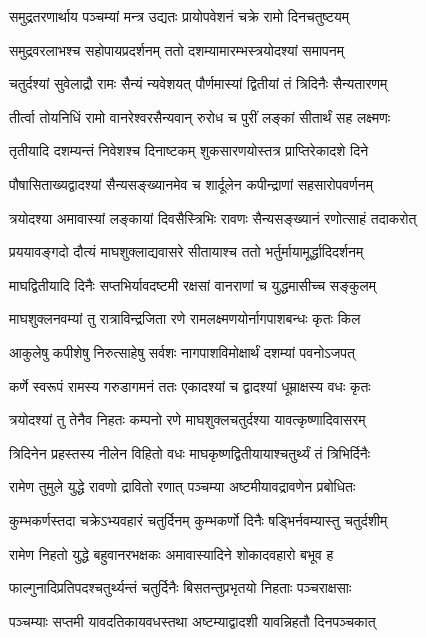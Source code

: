 \twolineshloka
{समुद्रतरणार्थाय पञ्चम्यां मन्त्र उद्यतः}
{प्रायोपवेशनं चक्रे रामो दिनचतुष्टयम्}%

\twolineshloka
{समुद्रवरलाभश्च सहोपायप्रदर्शनम्}
{ततो दशम्यामारम्भस्त्रयोदश्यां समापनम्}%

\twolineshloka
{चतुर्दश्यां सुवेलाद्रौ रामः सैन्यं न्यवेशयत्}
{पौर्णमास्यां द्वितीयां तं त्रिदिनैः सैन्यतारणम्}%

\twolineshloka
{तीर्त्वा तोयनिधिं रामो वानरेश्वरसैन्यवान्}
{रुरोध च पुरीं लङ्कां सीतार्थं सह लक्ष्मणः}%

\twolineshloka
{तृतीयादि दशम्यन्तं निवेशश्च दिनाष्टकम्}
{शुकसारणयोस्तत्र प्राप्तिरेकादशे दिने}%

\twolineshloka
{पौषासिताख्यद्वादश्यां सैन्यसङ्ख्यानमेव च}
{शार्दूलेन कपीन्द्राणां सहसारोपवर्णनम्}%

\twolineshloka
{त्रयोदश्या अमावास्यां लङ्कायां दिवसैस्त्रिभिः}
{रावणः सैन्यसङ्ख्यानं रणोत्साहं तदाकरोत्}%

\twolineshloka
{प्रययावङ्गदो दौत्यं माघशुक्लाद्यवासरे}
{सीतायाश्च ततो भर्तुर्मायामूर्द्धादिदर्शनम्}%

\twolineshloka
{माघद्वितीयादि दिनैः सप्तभिर्यावदष्टमी}
{रक्षसां वानराणां च युद्धमासीच्च सङ्कुलम्}%

\twolineshloka
{माघशुक्लनवम्यां तु रात्राविन्द्रजिता रणे}
{रामलक्ष्मणयोर्नागपाशबन्धः कृतः किल}%

\twolineshloka
{आकुलेषु कपीशेषु निरुत्साहेषु सर्वशः}
{नागपाशविमोक्षार्थं दशम्यां पवनोऽजपत्}%

\twolineshloka
{कर्णे स्वरूपं रामस्य गरुडागमनं ततः}
{एकादश्यां च द्वादश्यां धूम्राक्षस्य वधः कृतः}%

\twolineshloka
{त्रयोदश्यां तु तेनैव निहतः कम्पनो रणे}
{माघशुक्लचतुर्दश्या यावत्कृष्णादिवासरम्}%

\twolineshloka
{त्रिदिनेन प्रहस्तस्य नीलेन विहितो वधः}
{माघकृष्णद्वितीयायाश्चतुर्थ्यं तं त्रिभिर्दिनैः}%

\twolineshloka
{रामेण तुमुले युद्धे रावणो द्रावितो रणात्}
{पञ्चम्या अष्टमीयावद्रावणेन प्रबोधितः}%

\twolineshloka
{कुम्भकर्णस्तदा चक्रेऽभ्यवहारं चतुर्दिनम्}
{कुम्भकर्णो दिनैः षड्भिर्नवम्यास्तु चतुर्दशीम्}%

\twolineshloka
{रामेण निहतो युद्धे बहुवानरभक्षकः}
{अमावास्यादिने शोकादवहारो बभूव ह}%

\twolineshloka
{फाल्गुनादिप्रतिपदश्चतुर्थ्यन्तं चतुर्दिनैः}
{बिसतन्तुप्रभृतयो निहताः पञ्चराक्षसाः}%

\twolineshloka
{पञ्चम्याः सप्तमी यावदतिकायवधस्तथा}
{अष्टम्याद्वादशी यावन्निहतौ दिनपञ्चकात्}%

